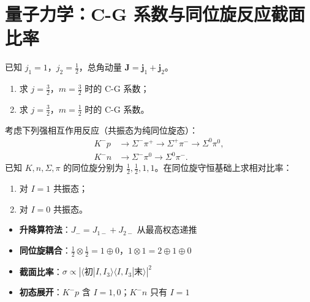 \section{量子力学：C-G 系数与同位旋反应截面比率}
\label{sec:cg-isospin-reaction}

\begin{modelbox}[题目：C-G 系数与同位旋反应截面比率]
已知 $j_1=1$，$j_2=\frac12$，总角动量 $\mathbf{J}=\mathbf{j}_1+\mathbf{j}_2$。
\begin{enumerate}
    \item 求 $j=\frac32$，$m=\frac32$ 时的 C-G 系数；
    \item 求 $j=\frac32$，$m=\frac12$ 时的 C-G 系数。
\end{enumerate}

考虑下列强相互作用反应（共振态为纯同位旋态）：
\begin{align*}
K^-p&\to\Sigma^-\pi^+\to\Sigma^+\pi^-\to\Sigma^0\pi^0,\\
K^-n&\to\Sigma^-\pi^0\to\Sigma^0\pi^-.
\end{align*}
已知 $K,n,\Sigma,\pi$ 的同位旋分别为 $\frac12,\frac12,1,1$。在同位旋守恒基础上求相对比率：
\begin{enumerate}
    \item[(3)] 对 $I=1$ 共振态；
    \item[(4)] 对 $I=0$ 共振态。
\end{enumerate}
\end{modelbox}

\begin{tipbox}[考点快速分析]
\begin{itemize}
    \item \textbf{升降算符法}：$J_-=J_{1-}+J_{2-}$ 从最高权态递推
    \item \textbf{同位旋耦合}：$\frac12\otimes\frac12=1\oplus0$，$1\otimes1=2\oplus1\oplus0$
    \item \textbf{截面比率}：$\sigma\propto|\langle\text{初}|I,I_3\rangle\langle I,I_3|\text{末}\rangle|^2$
    \item \textbf{初态展开}：$K^-p$ 含 $I=1,0$；$K^-n$ 只有 $I=1$
\end{itemize}
\end{tipbox}

